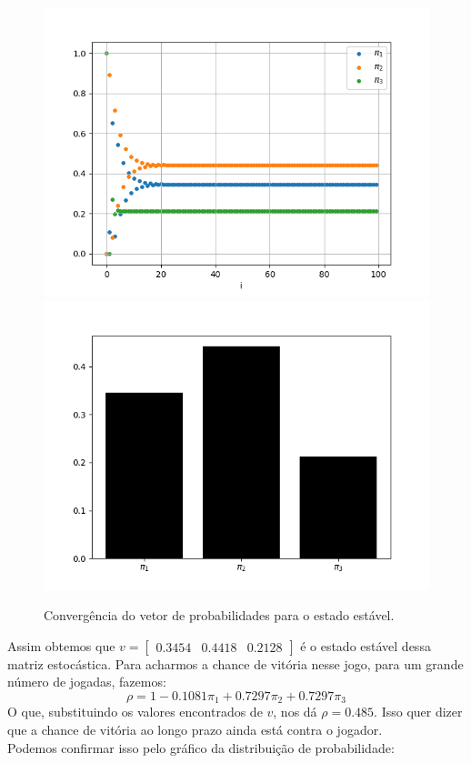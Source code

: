 \documentclass[12pt]{article}
\begin{document}
\begin{figure}[H]
\centering
\includegraphics[scale=0.55]{graph6.png}
\includegraphics[scale=0.55]{graph7.png}
\caption{Convergência do vetor de probabilidades para o estado estável.}
\end{figure}

Assim obtemos que $v = \begin{bmatrix} 0.3454 & 0.4418 & 0.2128 \end{bmatrix}$ é o estado estável dessa matriz estocástica. Para acharmos a chance de vitória nesse jogo, para um grande número de jogadas, fazemos:\\

$$
\rho = 1 - 0.1081\pi_1 + 0.7297\pi_2 + 0.7297\pi_3 
$$
O que, substituindo os valores encontrados de $v$, nos dá $\rho = 0.485$. Isso quer dizer que a chance de vitória ao longo prazo ainda está contra o jogador.\\
Podemos confirmar isso pelo gráfico da distribuição de probabilidade:
\end{document}
